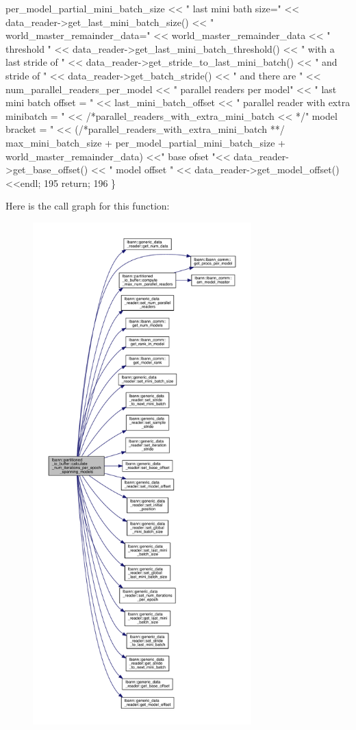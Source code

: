 \begin{DoxyCode}
{       per\_model\_partial\_mini\_batch\_size << " last mini bath size=" << data\_reader->get\_last\_mini\_batch\_size() << "
       world\_master\_remainder\_data=" << world\_master\_remainder\_data << " threshold " << data\_reader->get\_last\_mini\_batch\_threshold() << "
       with a last stride of " << data\_reader->get\_stride\_to\_last\_mini\_batch() << " and stride of " <<
       data\_reader->get\_batch\_stride() << " and there are " << num\_parallel\_readers\_per\_model << " parallel readers per model" <<
       " last mini batch offset = " << last\_mini\_batch\_offset <<  " parallel reader with extra minibatch = " <<
       /*parallel\_readers\_with\_extra\_mini\_batch << */" model bracket = " << (/*parallel\_readers\_with\_extra\_mini\_batch
       **/ max\_mini\_batch\_size + per\_model\_partial\_mini\_batch\_size + world\_master\_remainder\_data) <<" base ofset
       "<< data\_reader->get\_base\_offset() << " model offset " << data\_reader->get\_model\_offset() <<endl;}
195   \textcolor{keywordflow}{return};
196 \}
\end{DoxyCode}
Here is the call graph for this function\+:\nopagebreak
\begin{figure}[H]
\begin{center}
\leavevmode
\includegraphics[height=550pt]{classlbann_1_1partitioned__io__buffer_a50b6e2b7a82927526758f7cfb18a1ded_cgraph}
\end{center}
\end{figure}
